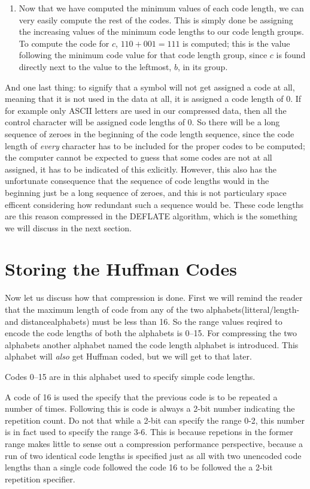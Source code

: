 \begin{enumerate}
  \item Now that we have computed the minimum values of each code
    length, we can very easily compute the rest of the codes. This is
    simply done be assigning the increasing values of the minimum code
    lengths to our code length groups. To compute the code for $c$,
    $110 + 001 = 111$ is computed; this is the value following the
    minimum code value for that code length group, since $c$ is found
    directly next to the value to the leftmost, $b$, in its group.

\end{enumerate}

And one last thing: to signify that a symbol will not get assigned a
code at all, meaning that it is not used in the data at all, it is
assigned a code length of $0$. If for example only ASCII letters are
used in our compressed data, then all the control character will be
assigned code lengths of $0$. So there will be a long sequence of
zeroes in the beginning of the code length sequence, since the code
length of \textit{every} character has to be included for the proper
codes to be computed; the computer cannot be expected to guess that
some codes are not at all assigned, it has to be indicated of this
exlicitly. However, this also has the unfortunate consequence that the
sequence of code lengths would in the beginning just be a long
sequence of zeroes, and this is not particulary space efficent
considering how redundant such a sequence would be. These code lengths
are this reason compressed in the DEFLATE algorithm, which is the
something we will discuss in the next section.

\section{Storing the Huffman Codes}

Now let us discuss how that compression is done. First we will remind
the reader that the maximum length of code from any of the two
alphabets(litteral/length- and distancealphabets) must be less than
16. So the range values reqired to encode the code lengths of both the
alphabets is 0--15. For compressing the two alphabets another alphabet
named the code length alphabet is introduced. This alphabet will
\textit{also} get Huffman coded, but we will get to that later.

Codes 0--15 are in this alphabet used to specify simple code
lengths.

A code of 16 is used the specify that the previous code is to be
repeated a number of times. Following this is code is always a 2-bit
number indicating the repetition count. Do not that while a 2-bit can
specify the range 0-2, this number is in fact used to specify the
range 3-6. This is because repetions in the former range makes little
to sense out a compression performance perspective, because a run of
two identical code lengths is specified just as all with two unencoded
code lengths than a single code followed the code 16 to be followed
the a 2-bit repetition specifier.

